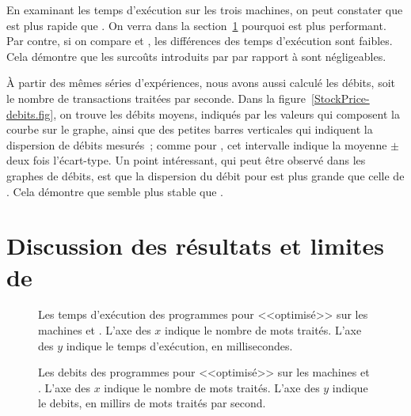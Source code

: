 En examinant les temps d'ex\'ecution sur les trois machines, on peut constater que  est plus rapide que . On verra dans la section~\ref{limitesppff.sect} pourquoi  est plus performant. Par contre, si on compare  et , les diff\'erences des temps d'ex\'ecution sont faibles. Cela d\'emontre que les surco\^uts introduits par  par rapport \`a  sont négligeables.

\`A partir des m\^emes s\'eries d'exp\'eriences, nous avons aussi calcul\'e les d\'ebits, soit le nombre de transactions trait\'ees par seconde. Dans la figure~\ref{StockPrice-debits.fig}, on trouve les d\'ebits moyens, indiqués par les valeurs qui composent la courbe sur le graphe, ainsi que des petites barres verticales qui indiquent la dispersion de débits mesurés~; comme pour , cet intervalle indique la moyenne $\pm$ deux fois l'écart-type. Un point int\'eressant, qui peut \^etre observ\'e dans les graphes de d\'ebits, est que la dispersion du d\'ebit pour  est plus grande que celle de . Cela d\'emontre que  semble plus stable que . 

\section{Discussion des résultats et limites de \ppff}
\label{limitesppff.sect}


\begin{figure}


\caption[Les temps d'exécution des programmes pour 
<<optimisé>> sur les machines  et .]{Les temps d'exécution des
programmes pour  <<optimisé>> sur les machines  et
. L'axe des $x$ indique le nombre de mots traités. L'axe des $y$
indique le temps d'exécution, en millisecondes.}
\label{WordCount-merged-temps.fig}
\end{figure}


\begin{figure}


\caption[Les debits des programmes pour 
<<optimisé>> sur les machines  et .]{Les debits des
programmes pour  <<optimisé>> sur les machines  et
. L'axe des $x$ indique le nombre de mots traités. L'axe des $y$
indique le debits, en millirs de mots traités par second.}
\label{WordCount-merged-debit.fig}
\end{figure}


